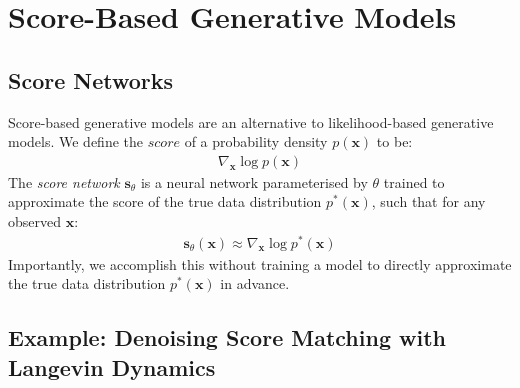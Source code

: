 \documentclass[ oneside,%
                    author={George Herbert},
                    degree={MSci},
                     title={Video Diffusion Models for Climate Simulations},
                  subtitle={}]{dissertation}
\begin{document}
\section{Score-Based Generative Models}
\label{sec:background_score}

\subsection{Score Networks}
\label{sec:background_score_score_network}

Score-based generative models \cite{Generative_Modelling_By_Estimating_Gradients_Song,Score_Based_Song} are an alternative to likelihood-based generative models. We define the $score$ of a probability density $p(\mathbf{x})$ to be:
\begin{align}
      \nabla_{\mathbf{x}} \log p(\mathbf{x})
\end{align}
The \textit{score network} $\mathbf{s}_\theta$ is a neural network parameterised by $\theta$ trained to approximate the score of the true data distribution $p^*(\mathbf{x})$, such that for any observed $\mathbf{x}$:
\begin{align}
      \mathbf{s}_\theta(\mathbf{x})\approx \nabla_{\mathbf{x}} \log p^*(\mathbf{x})
\end{align}
Importantly, we accomplish this without training a model to directly approximate the true data distribution $p^*(\mathbf{x})$ in advance.

\subsection{Example: Denoising Score Matching with Langevin Dynamics}
\label{sec:background_score_denoising}
\end{document}
